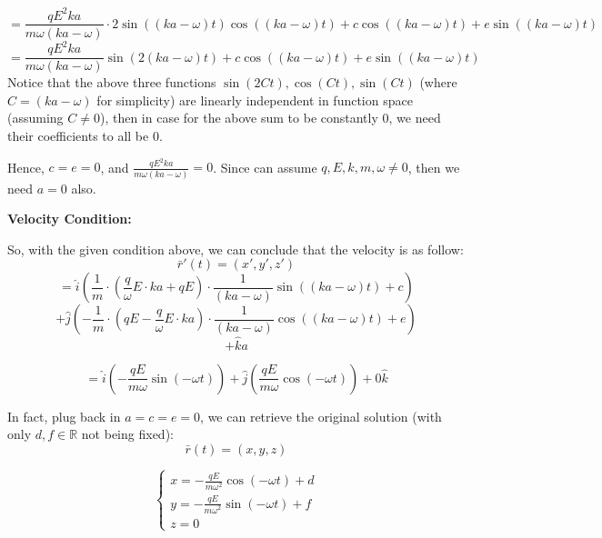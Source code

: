 \documentclass{article}
\begin{document}
$$ = \frac{qE^2ka}{m\omega(ka-\omega)}\cdot 2\sin((ka-\omega)t)\cos((ka-\omega)t)  + c\cos((ka-\omega)t)+e\sin((ka-\omega)t)$$
$$ =\frac{qE^2ka}{m\omega(ka-\omega)}\sin(2(ka-\omega)t)+ c\cos((ka-\omega)t)+e\sin((ka-\omega)t)$$
Notice that the above three functions $\sin(2Ct),\cos(Ct),\sin(Ct)$ (where $C=(ka-\omega)$ for simplicity) are linearly independent in function space (assuming $C\neq 0$),
then in case for the above sum to be constantly $0$, we need their coefficients to all be $0$.

Hence, $c=e=0$, and $\frac{qE^2ka}{m\omega(ka-\omega)}=0$. Since can assume $q,E,k,m,\omega\neq 0$, then we need $a=0$ also.

\hfil

\textbf{Velocity Condition:}

So, with the given condition above, we can conclude that the velocity is as follow:
$$\bar{r}'(t)=(x',y',z')$$
$$=\hat{i}\left(\frac{1}{m}\cdot\left(\frac{q}{\omega}E\cdot ka+qE\right)\cdot\frac{1}{(ka-\omega)}\sin((ka-\omega)t)+c\right)$$
$$ + \hat{j}\left(-\frac{1}{m}\cdot\left(qE-\frac{q}{\omega}E\cdot ka\right)\cdot\frac{1}{(ka-\omega)}\cos((ka-\omega)t)+e\right)$$
$$+\hat{k}a$$

$$=\hat{i}\left(-\frac{qE}{m\omega}\sin(-\omega t)\right) + \hat{j}\left(\frac{qE}{m\omega}\cos(-\omega t)\right) + 0\hat{k}$$

\hfil

In fact, plug back in $a=c=e=0$, we can retrieve the original solution (with only $d,f\in\mathbb{R}$ not being fixed):
$$\bar{r}(t)=(x,y,z)$$

$$\begin{cases}
    x=-\frac{qE}{m\omega^2}\cos(-\omega t)+d\\
    y=-\frac{qE}{m\omega^2}\sin(-\omega t)+f\\
    z=0
\end{cases}$$
\end{document}
